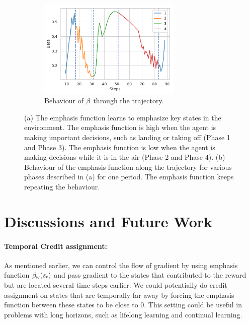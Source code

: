 \begin{figure}[h]
\begin{subfigure}{.45\textwidth}
\end{subfigure}
\begin{subfigure}{.45\textwidth}
    \centering
    \includegraphics[width=\textwidth,height=4.7cm]{fig/beta_hopper.pdf}
    \caption{Behaviour of $\beta$ through the trajectory.}
    \label{fig:cyle_hopper}
\end{subfigure}
\caption{(a) The emphasis function learns to emphasize key states in the environment. The emphasis function is high when the agent is making important decisions, such as landing or taking off (Phase 1 and Phase 3). The emphasis function is low when the agent is making decisions while it is in the air (Phase 2 and Phase 4). (b) Behaviour of the emphasis function along the trajectory for various phases described in (a) for one period. The emphasis function keeps repeating the behaviour.}
\end{figure}
\section{Discussions and Future Work}
\paragraph{Temporal Credit assignment:} As mentioned earlier, we can control the flow of gradient by using emphasis function $\beta_{\omega}(s_t)$ and pass gradient to the states that contributed to the reward but are located several time-steps earlier. We could potentially do credit assignment on states that are temporally far away by forcing the emphasis function between these states to be close to $0$. This setting could be useful in problems with long horizons, such as lifelong learning and continual learning.


